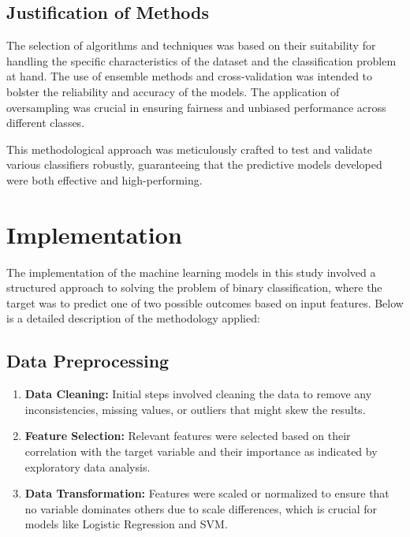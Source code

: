 \documentclass[a4paper,num-refs,gigabyte]{oup-contemporary}
\begin{document}
\subsection{Justification of Methods}
The selection of algorithms and techniques was based on their suitability for handling the specific characteristics of the dataset and the classification problem at hand. The use of ensemble methods and cross-validation was intended to bolster the reliability and accuracy of the models. The application of oversampling was crucial in ensuring fairness and unbiased performance across different classes.

This methodological approach was meticulously crafted to test and validate various classifiers robustly, guaranteeing that the predictive models developed were both effective and high-performing.

\section{Implementation}

The implementation of the machine learning models in this study involved a structured approach to solving the problem of binary classification, where the target was to predict one of two possible outcomes based on input features. Below is a detailed description of the methodology applied:

\subsection{Data Preprocessing}
\begin{enumerate}
    \item \textbf{Data Cleaning:} Initial steps involved cleaning the data to remove any inconsistencies, missing values, or outliers that might skew the results.
    \item \textbf{Feature Selection:} Relevant features were selected based on their correlation with the target variable and their importance as indicated by exploratory data analysis.
    \item \textbf{Data Transformation:} Features were scaled or normalized to ensure that no variable dominates others due to scale differences, which is crucial for models like Logistic Regression and SVM.
\end{enumerate}
\end{document}
